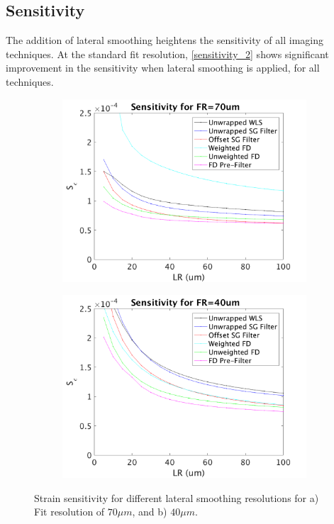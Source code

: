 \subsection{Sensitivity}

The addition of lateral smoothing heightens the sensitivity of all imaging techniques. At the standard fit resolution, \autoref{sensitivity_2} shows significant improvement in the sensitivity when lateral smoothing is applied, for all techniques.

\begin{figure}[b!]
	\centering
    \begin{subfigure}{0.49\textwidth}
    	\centering
        \includegraphics[width=\textwidth]{figures/sensitivity_FR70.png}
    \end{subfigure}
    \begin{subfigure}{0.49\textwidth}
    	\centering
        \includegraphics[width=\textwidth]{figures/sensitivity_FR40.png}
    \end{subfigure}
    \caption{Strain sensitivity for different lateral smoothing resolutions for a) Fit resolution of $70\mu m$, and b) $40\mu m$.}
    \label{sensitivity_2}	
\end{figure}


